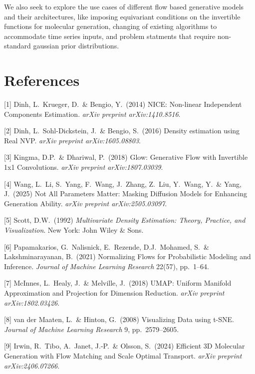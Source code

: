 \documentclass{article}
\begin{document}
\noindent We also seek to explore the use cases of different flow based generative models and their architectures, like imposing equivariant conditions on the invertible functions for molecular generation, changing of existing algorithms to accommodate time series inputs, and problem statments that require non-standard gaussian prior distributions.

\section*{References}


\small

[1] Dinh, L.\ Krueger, D.\ \& Bengio, Y.\ (2014) NICE: Non-linear Independent Components Estimation. {\it arXiv preprint arXiv:1410.8516}.

[2] Dinh, L.\ Sohl-Dickstein, J.\ \& Bengio, S.\ (2016) Density estimation using Real NVP. {\it arXiv preprint arXiv:1605.08803}.

[3] Kingma, D.P.\ \& Dhariwal, P.\ (2018) Glow: Generative Flow with Invertible 1x1 Convolutions. {\it arXiv preprint arXiv:1807.03039}.

[4] Wang, L.\ Li, S.\ Yang, F.\ Wang, J.\ Zhang, Z.\ Liu, Y.\ Wang, Y.\ \& Yang, J.\ (2025) Not All Parameters Matter: Masking Diffusion Models for Enhancing Generation Ability. {\it arXiv preprint arXiv:2505.03097}.

[5] Scott, D.W.\ (1992) {\it Multivariate Density Estimation: Theory, Practice, and Visualization}. New York: John Wiley \& Sons.

[6] Papamakarios, G.\ Nalisnick, E.\ Rezende, D.J.\ Mohamed, S.\ \& Lakshminarayanan, B.\ (2021) Normalizing Flows for Probabilistic Modeling and Inference. {\it Journal of Machine Learning Research} 22(57), pp.\ 1--64.

[7] McInnes, L.\ Healy, J.\ \& Melville, J.\ (2018) UMAP: Uniform Manifold Approximation and Projection for Dimension Reduction. {\it arXiv preprint arXiv:1802.03426}.

[8] van der Maaten, L.\ \& Hinton, G.\ (2008) Visualizing Data using t-SNE. {\it Journal of Machine Learning Research} 9, pp.\ 2579--2605.

[9] Irwin, R.\ Tibo, A.\ Janet, J.-P.\ \& Olsson, S.\ (2024) Efficient 3D Molecular Generation with Flow Matching and Scale Optimal Transport. {\it arXiv preprint arXiv:2406.07266}.
\end{document}
